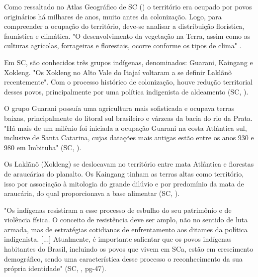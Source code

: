 \indent Como ressaltado no Atlas Geográfico de \acrlong{SC} (\citeyear{AtlasSCpopulacao}) o território era ocupado por povos originários há milhares de anos, muito antes da colonização. Logo, para compreender a ocupação do território, deve-se analisar a distribuição florística, faunística e climática. "O desenvolvimento da vegetação na Terra, assim como as culturas agrícolas, forrageiras e florestais, ocorre conforme os tipos de clima" \cite{AtlasClimaticoSul}.


\indent Em \acrlong{SC}, são conhecidos três grupos indígenas, denominados: Guarani, Kaingang e Xokleng. "Os Xokleng no Alto Vale do Itajaí voltaram a se definir Laklãnõ recentemente". Com o processo histórico de colonização, houve redução  territorial desses povos, principalmente por uma política indigenista de aldeamento (\acrlong{SC}, \citeyear{AtlasSCpopulacao}).

\indent O grupo Guarani possuía uma agricultura mais sofisticada e ocupava terras baixas, principalmente do litoral sul brasileiro e várzeas da bacia do rio da Prata. "Há mais de um milênio foi iniciada a ocupação Guarani na costa Atlântica sul, inclusive de Santa Catarina, cujas datações mais antigas estão entre os anos 930 e 980 em Imbituba" (\acrlong{SC}, \citeyear{AtlasSCpopulacao}).

\indent Os Laklãnõ (Xokleng) se deslocavam no território entre mata Atlântica e florestas de araucárias do planalto. Os Kaingang tinham as terras altas como território, isso por associação à mitologia do grande dilúvio e por predomínio da mata de araucária, do qual proporcionava a base alimentar (\acrlong{SC}, \citeyear{AtlasSCpopulacao}).

\begin{citacao}
"Os indígenas resistiram a esse processo de esbulho do seu patrimônio e de violência física. O conceito de resistência deve ser amplo, não no sentido de luta armada, mas de estratégias cotidianas de enfrentamento aos ditames da política indigenista. [...] Atualmente, é importante salientar que os povos indígenas habitantes do Brasil, incluindo os povos que vivem em \acrlong{SC}a, estão em crescimento demográfico, sendo uma característica desse processo o reconhecimento da sua própria identidade" (\acrlong{SC}, \citeyear{AtlasSCpopulacao}, pg-47).
\end{citacao}

